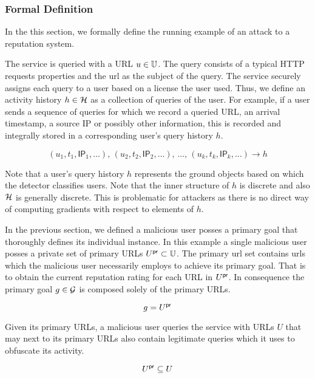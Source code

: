 \subsubsection{Formal Definition}
In the this section, we formally define the running example of an attack to a reputation system.

The service is queried with a URL $u \in \mathbb{U}$. The query consists of a typical HTTP requests properties and the url as the subject of the query. The service securely assigns each query to a user based on a license the user used. Thus, we define an activity history $h \in \mathcal{H}$ as a collection of queries of the user. For example, if a user sends a sequence of queries for which we record a queried URL, an arrival timestamp, a source IP or possibly other information, this is recorded and integrally stored in a corresponding user’s query history $h$.

\begin{equation}
(u_1, t_1, \mathsf{IP}_1, \dots), \, (u_2, t_2, \mathsf{IP}_2, \dots), \, \dots, \, (u_k, t_k, \mathsf{IP}_k, \dots) \longrightarrow h
\end{equation}

Note that a user's query history $h$ represents the ground objects based on which the detector classifies users. Note that the inner structure of $h$ is discrete and also $\mathcal{H}$ is generally discrete. This is problematic for attackers as there is no direct way of computing gradients with respect to elements of $h$.

In the previous section, we defined a malicious user posses a primary goal that thoroughly defines its individual instance. In this example a single malicious user posses a private set of primary URLs $U^{\mathsf{pr}} \subset \mathbb{U}$. The primary url set contains urls which the malicious user necessarily employs to achieve its primary goal. That is to obtain the current reputation rating for each URL in $U^{\mathsf{pr}}$. In consequence the primary goal $g \in \mathcal{G}$ is composed solely of the primary URLs.

\begin{equation}
    g = U^{\mathsf{pr}}
\end{equation}

Given its primary URLs, a malicious user queries the service with URLs $U$ that may next to its primary URLs also contain legitimate queries which it uses to
obfuscate its activity.

\begin{equation}
U^{\mathsf{pr}} \subseteq U
\end{equation}


